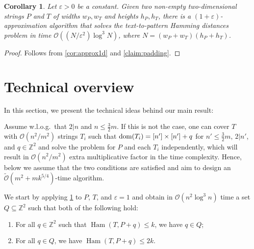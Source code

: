 \documentclass[a4paper,11pt]{article}
\newtheorem{corollary}{Corollary}[section]
\newcommand{\Z}{\mathbb{Z}}
\renewcommand{\O}{\mathcal{O}}
\newcommand{\tO}{\tilde{\mathcal{O}}}
\DeclareMathOperator*{\Ham}{Ham}
\begin{document}
\begin{corollary}\label{cor:approx2d}
Let $\varepsilon > 0$ be a constant. Given two non-empty two-dimensional strings $P$ and $T$ of widths $w_P, w_T$ and heights $h_P, h_T$, there is a $(1+\varepsilon)$-approximation algorithm that solves the text-to-pattern Hamming distances problem in time $\O((N/\varepsilon^2)  \log^3 N)$, where $N = (w_P + w_T)(h_P + h_T)$.
\end{corollary}
\begin{proof}
Follows from \cref{cor:approx1d} and \cref{claim:padding}. 
\end{proof}


\section{Technical overview}
In this section, we present the technical ideas behind our main result:


\def\mainThmTitle{Formal version}
\def\mainThmContent{%
Given two-dimensional strings $P$ with $\d{P} = [m] \times [m]$ and $T$ with $\d{T} = [n] \times [n]$, where $m,n\in \Z^+$ and $m \le n$. There is an algorithm that solves the $k$-mismatch problem for $P,T$ in $\tO((m^2 + mk^{5/4})n^2 / m^2)$ time.%
}

\restateThmMain*

Assume w.l.o.g.~that $2|n$ and $n \le \frac{3}{2}m$. If this is not the case, one can cover $T$ with $\O(n^2/m^2)$ strings $T_i$ such that $\operatorname*{dom}(T_i) = [n'] \times [n'] + q$ for $n' \le \frac{3}{2}m$, $2|n'$, and $q \in \Z^2$ and solve the problem for $P$ and each $T_i$ independently, which will result in $\O(n^2/m^2)$ extra multiplicative factor in the time complexity. Hence, below we assume that the two conditions are satisfied and aim to design an $\tO(m^2 + mk^{5/4})$-time algorithm. 

We start by applying \cref{cor:approx2d} to $P$, $T$, and $\varepsilon = 1$ and obtain in $\O(n^2 \log^3 n)$ time a set $Q \subseteq \Z^2$ such that both of the following hold:
\begin{enumerate}
\item For all $q \in \Z^2$ such that $\Ham(T, P+q) \le k$, we have $q \in Q$;
\item For all $q \in Q$, we have $\Ham(T, P+q) \le 2 k$.
\end{enumerate}
\end{document}
